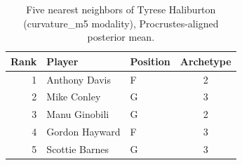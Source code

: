 \begin{table}[htbp]
  \centering\small
  \begin{tabular}{rllc}
    \toprule
    Rank & Player & Position & Archetype \\
    \midrule
    1 & Anthony Davis & F & 2 \\
    2 & Mike Conley & G & 3 \\
    3 & Manu Ginobili & G & 2 \\
    4 & Gordon Hayward & F & 3 \\
    5 & Scottie Barnes & G & 3 \\
    \bottomrule
  \end{tabular}
  \caption{Five nearest neighbors of Tyrese Haliburton (curvature_m5 modality), Procrustes-aligned posterior mean.}
  \label{tab:Tyrese_Haliburton_neighbors_curvature_m5}
\end{table}

